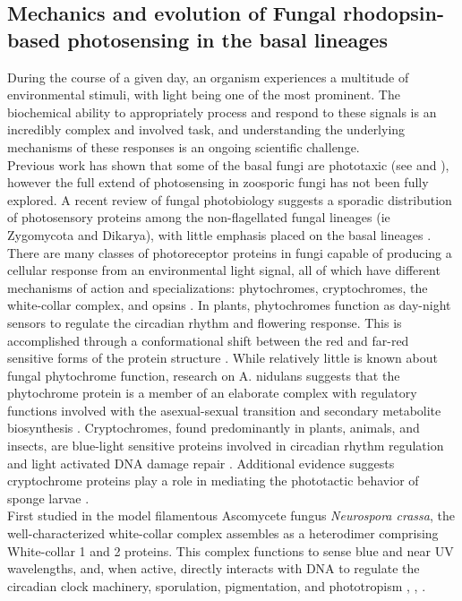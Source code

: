 \subsection{Mechanics and evolution of Fungal rhodopsin-based photosensing in the basal lineages}
\indent During the course of a given day, an organism experiences a multitude of environmental stimuli, with light being one of the most prominent. The biochemical ability to appropriately process and respond to these signals is an incredibly complex and involved task, and understanding the underlying mechanisms of these responses is an ongoing scientific challenge. \\
\indent Previous work has shown that some of the basal fungi are phototaxic (see \cite{Saranak1997} and \cite{Muehlstein1987}), however the full extend of photosensing in zoosporic fungi has not been fully explored. A recent review of fungal photobiology suggests a sporadic distribution of photosensory proteins among the non-flagellated fungal lineages (ie Zygomycota and Dikarya), with little emphasis placed on the basal lineages \cite{Idnurm2010}. There are many classes of photoreceptor proteins in fungi capable of producing a cellular response from an environmental light signal, all of which have different mechanisms of action and specializations: phytochromes, cryptochromes, the white-collar complex, and opsins \cite{Idnurm2010}. In plants, phytochromes function as day-night sensors to regulate the circadian rhythm and flowering response. This is accomplished through a conformational shift between the red and far-red sensitive forms of the protein structure \cite{Rockwell2006}. While relatively little is known about fungal phytochrome function, research on A. nidulans suggests that the phytochrome protein is a member of an elaborate complex with regulatory functions involved with the asexual-sexual transition and secondary metabolite biosynthesis \cite{Idnurm2010}. Cryptochromes, found predominantly in plants, animals, and insects, are blue-light sensitive proteins involved in circadian rhythm regulation and light activated DNA damage repair \cite{Idnurm et al. 2010}. Additional evidence suggests cryptochrome proteins play a role in mediating the phototactic behavior of sponge larvae \cite{Rivera2012}.\\
\indent First studied in the model filamentous Ascomycete fungus \textit{Neurospora crassa}, the well-characterized white-collar complex assembles as a heterodimer comprising White-collar 1 and 2 proteins. This complex functions to sense blue and near UV wavelengths, and, when active, directly interacts with DNA to regulate the circadian clock machinery, sporulation, pigmentation, and phototropism \cite{Ballario1997}, \cite{Purschwitz2006}, \cite{Corrochano2007}. \\
